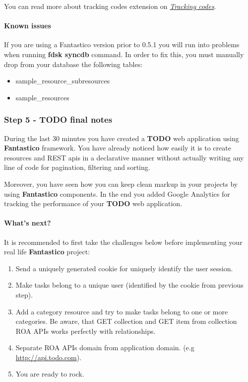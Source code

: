 \documentclass[letterpaper,10pt,english]{sphinxmanual}
\begin{document}
You can read more about tracking codes extension on {\hyperref[features/components/tracking_codes/tracking_codes::doc]{\emph{Tracking codes}}}.


\paragraph{Known issues}
\label{how_to/todo/step_4_activate_googleanalytics:known-issues}
If you are using a Fantastico version prior to 0.5.1 you will run into problems when running \textbf{fdsk syncdb} command. In order to fix this,
you must manually drop from your database the following tables:
\begin{itemize}
\item {} 
sample\_resource\_subresources

\item {} 
sample\_resources

\end{itemize}


\subsubsection{Step 5 - TODO final notes}
\label{how_to/todo/step_5_final_notes:step-5-todo-final-notes}\label{how_to/todo/step_5_final_notes::doc}
During the last 30 minutes you have created a \textbf{TODO} web application using \textbf{Fantastico} framework. You have already noticed
how easily it is to create resources and REST apis in a declarative manner without actually writing any line of code for
pagination, filtering and sorting.

Moreover, you have seen how you can keep clean markup in your projects by using \textbf{Fantastico} components. In the end you added
Google Analytics for tracking the performance of your \textbf{TODO} web application.


\paragraph{What's next?}
\label{how_to/todo/step_5_final_notes:what-s-next}
It is recommended to first take the challenges below before implementing your real life \textbf{Fantastico} project:
\begin{enumerate}
\item {} 
Send a uniquely generated cookie for uniquely identify the user session.

\item {} 
Make tasks belong to a unique user (identified by the cookie from previous step).

\item {} 
Add a category resource and try to make tasks belong to one or more categories. Be aware, that GET collection and GET item
from collection ROA APIs works perfectly with relationships.

\item {} 
Separate ROA APIs domain from application domain. (e.g \href{http://api.todo.com}{http://api.todo.com}).

\item {} 
You are ready to rock.

\end{enumerate}
\end{document}
